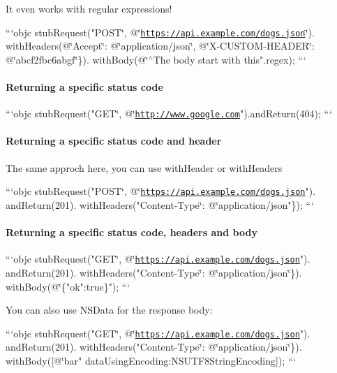 It even works with regular expressions!

```objc stub\-Request("P\-O\-S\-T\char`\"{}, @\char`\"{}\href{https://api.example.com/dogs.json}{\tt https\-://api.\-example.\-com/dogs.\-json}\char`\"{}).
with\-Headers(@\char`\"{}Accept\char`\"{}\-: @\char`\"{}application/json\char`\"{}, @\char`\"{}X-\/\-C\-U\-S\-T\-O\-M-\/\-H\-E\-A\-D\-E\-R\char`\"{}\-: @\char`\"{}abcf2fbc6abgf\char`\"{}\}).
with\-Body(@\char`\"{}$^\wedge$\-The body start with this".regex); ```

\paragraph*{Returning a specific status code}

```objc stub\-Request("G\-E\-T\char`\"{}, @\char`\"{}\href{http://www.google.com}{\tt http\-://www.\-google.\-com}").and\-Return(404); ```

\paragraph*{Returning a specific status code and header}

The same approch here, you can use {\ttfamily with\-Header} or {\ttfamily with\-Headers}

```objc stub\-Request("P\-O\-S\-T\char`\"{}, @\char`\"{}\href{https://api.example.com/dogs.json}{\tt https\-://api.\-example.\-com/dogs.\-json}"). and\-Return(201). with\-Headers("Content-\/\-Type\char`\"{}\-: @\char`\"{}application/json"\}); ```

\paragraph*{Returning a specific status code, headers and body}

```objc stub\-Request("G\-E\-T\char`\"{}, @\char`\"{}\href{https://api.example.com/dogs.json}{\tt https\-://api.\-example.\-com/dogs.\-json}"). and\-Return(201). with\-Headers("Content-\/\-Type\char`\"{}\-: @\char`\"{}application/json\char`\"{}\}).
with\-Body(@\char`\"{}\{"ok"\-:true\}"); ```

You can also use {\ttfamily N\-S\-Data} for the response body\-:

```objc stub\-Request("G\-E\-T\char`\"{}, @\char`\"{}\href{https://api.example.com/dogs.json}{\tt https\-://api.\-example.\-com/dogs.\-json}"). and\-Return(201). with\-Headers("Content-\/\-Type\char`\"{}\-: @\char`\"{}application/json\char`\"{}\}).
with\-Body(\mbox{[}@\char`\"{}bar" data\-Using\-Encoding\-:N\-S\-U\-T\-F8\-String\-Encoding\mbox{]}); ```

